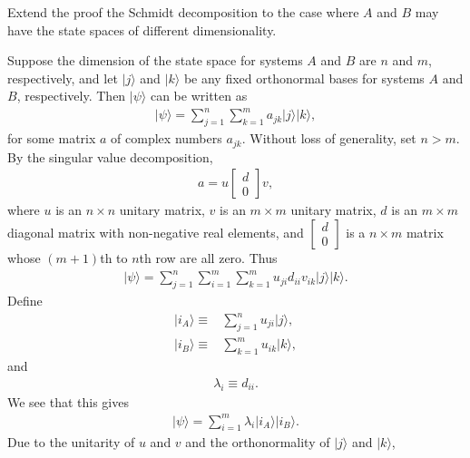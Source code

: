 \documentclass[en]{sol-man}
\begin{document}
\begin{exe}
    Extend the proof the Schmidt decomposition to the case where $A$ and $B$ may have the state spaces of different dimensionality.
\end{exe}
\begin{pf}
    Suppose the dimension of the state space for systems $A$ and $B$ are $n$ and $m$, respectively, and let $\lvert j\rangle$ and $\lvert k\rangle$ be any fixed orthonormal bases for systems $A$ and $B$, respectively.
    Then $\lvert\psi\rangle$ can be written as
    \begin{align}
        \lvert\psi\rangle=\sum_{j=1}^n\sum_{k=1}^ma_{jk}\lvert j\rangle\lvert k\rangle,
    \end{align}
    for some matrix $a$ of complex numbers $a_{jk}$.
    Without loss of generality, set $n>m$. By the singular value decomposition,
    \begin{align}
        a=u\left[\begin{matrix}
            d\\
            0
        \end{matrix}\right]v,
    \end{align}
    where $u$ is an $n\times n$ unitary matrix, $v$ is an $m\times m$ unitary matrix, $d$ is an $m\times m$ diagonal matrix with non-negative real elements, and $\left[\begin{smallmatrix}
        d\\
        0
    \end{smallmatrix}\right]$ is a $n\times m$ matrix whose $(m+1)$th to $n$th row are all zero.
    Thus
    \begin{align}
        \lvert\psi\rangle=\sum_{j=1}^n\sum_{i=1}^m\sum_{k=1}^mu_{ji}d_{ii}v_{ik}\lvert j\rangle\lvert k\rangle.
    \end{align}
    Define
    \begin{align}
        \lvert i_A\rangle\equiv&\sum_{j=1}^nu_{ji}\lvert j\rangle,\\
        \lvert i_B\rangle\equiv&\sum_{k=1}^mu_{ik}\lvert k\rangle,
    \end{align}
    and
    \begin{align}
        \lambda_i\equiv d_{ii}.
    \end{align}
    We see that this gives
    \begin{align}
        \lvert\psi\rangle=\sum_{i=1}^m\lambda_i\lvert i_A\rangle\lvert i_B\rangle.
    \end{align}
    Due to the unitarity of $u$ and $v$ and the orthonormality of $\lvert j\rangle$ and $\lvert k\rangle$,

\end{pf}
\end{document}
